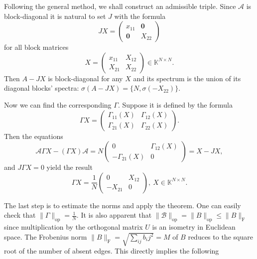 \documentclass[a4paper]{jpconf}
\begin{document}
Following the general method, we shall construct an admissible triple.
Since \( \mathcal{A} \) is block-diagonal
    it is natural to set \( J \) with the formula
    \[
        JX =
        \left(\begin{array}{c|c}
            x_{11} & \mathbf{0} \\ \hline
            \mathbf{0} & X_{22}
        \end{array}\right)
    \]
    for all block matrices
    \[
        X =
        \left(\begin{array}{c|c}
            x_{11} & X_{12} \\ \hline
            X_{21} & X_{22}
        \end{array}\right)\in\mathbb{K}^{N{\times}N}.
    \]
Then \( A - JX \) is block-diagonal for any \( X \)
    and its spectrum is the union
    of its diagonal blocks' spectra:
    \( \sigma(A - JX) = \{N, \sigma(-X_{22}) \} \).

Now we can find the corresponding \( \Gamma \).
Suppose it is defined by the formula
    \[ \Gamma X = \begin{pmatrix}
        \Gamma_{11}(X) & \Gamma_{12}(X) \\
        \Gamma_{21}(X) & \Gamma_{22}(X)
        \end{pmatrix}.
    \]
Then the equations
    \[
        \mathcal{A} \Gamma X - (\Gamma X)\mathcal{A} =
        N
        \begin{pmatrix}
          0 & \Gamma_{12}(X) \\
          -\Gamma_{21}(X) & 0
        \end{pmatrix} = X - JX,
     \]
and \( J\Gamma X = 0 \) yield the result
    \[
        \Gamma X = \frac{1}{N} \begin{pmatrix} 0 & X_{12} \\ -X_{21} & 0 \end{pmatrix},\ X\in\mathbb{K}^{N{\times}N}.
    \]

The last step is to estimate the norms and apply the theorem.
One can easily check that \( \|\Gamma\|_{\mathrm{op}} = \frac1N \).
It is also apparent that \( \|\mathcal{B}\|_{\mathrm{op}} = \|B\|_{\mathrm{op}} \leq \|B\|_{\mathrm{F}} \)
    since multiplication by the orthogonal matrix \( U \)
    is an isometry in Euclidean space.
The Frobenius norm \( {\|B\|_{\mathrm{F}} = \sqrt{\sum_{ij} b_ij^2} = M} \)
    of \( B \)
    reduces to the square root of the number of absent edges.
This directly implies the following
\end{document}
